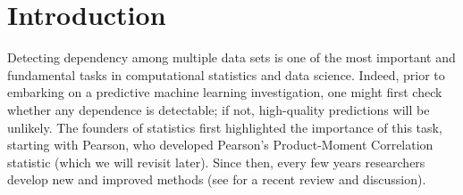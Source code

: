 \documentclass[11pt]{article}
\begin{document}


\section{Introduction}

Detecting dependency among multiple data sets is one of the most important and fundamental tasks in computational statistics and data science. 
Indeed, prior to embarking on a predictive machine learning investigation, one might first check whether any dependence is detectable; if not, high-quality predictions will be unlikely.  
The founders of statistics first highlighted the importance of this task, starting with Pearson, who developed Pearson's Product-Moment Correlation statistic  \cite{Pearson1895} (which we will revisit later).  Since then, every few years researchers develop new and improved methods (see \cite{Reimherr2013} for a recent review and discussion).  
\end{document}
